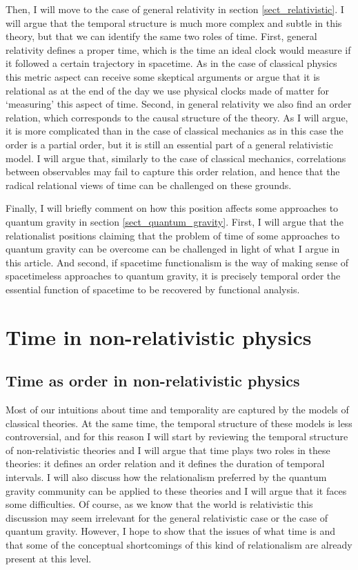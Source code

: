 \documentclass[12 pt]{article}
\begin{document}
Then, I will move to the case of general relativity in section \ref{sect_relativistic}. I will argue that the temporal structure is much more complex and subtle in this theory, but that we can identify the same two roles of time. First, general relativity defines a proper time, which is the time an ideal clock would measure if it followed a certain trajectory in spacetime. As in the case of classical physics this metric aspect can receive some skeptical arguments or argue that it is relational as at the end of the day we use physical clocks made of matter for `measuring' this aspect of time. Second, in general relativity we also find an order relation, which corresponds to the causal structure of the theory. As I will argue, it is more complicated than in the case of classical mechanics as in this case the order is a partial order, but it is still an essential part of a general relativistic model. I will argue that, similarly to the case of classical mechanics, correlations between observables may fail to capture this order relation, and hence that the radical relational views of time can be challenged on these grounds.

Finally, I will briefly comment on how this position affects some approaches to quantum gravity in section \ref{sect_quantum_gravity}. First, I will argue that the relationalist positions claiming that the problem of time of some approaches to quantum gravity can be overcome can be challenged in light of what I argue in this article. And second, if spacetime functionalism is the way of making sense of spacetimeless approaches to quantum gravity, it is precisely temporal order the essential function of spacetime to be recovered by functional analysis.


\section{Time in non-relativistic physics} \label{sect_non-relat}


\subsection{Time as order in non-relativistic physics}

Most of our intuitions about time and temporality are captured by the models of classical theories. At the same time, the temporal structure of these models is less controversial, and for this reason I will start by reviewing the temporal structure of non-relativistic theories and I will argue that time plays two roles in these theories: it defines an order relation and it defines the duration of temporal intervals. I will also discuss how the relationalism preferred by the quantum gravity community can be applied to these theories and I will argue that it faces some difficulties. Of course, as we know that the world is relativistic this discussion may seem irrelevant for the general relativistic case or the case of quantum gravity. However, I hope to show that the issues of what time is and that some of the conceptual shortcomings of this kind of relationalism are already present at this level.
\end{document}
